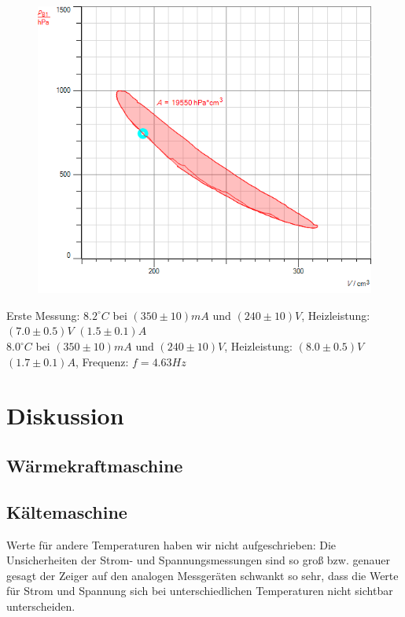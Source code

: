 \documentclass[12pt,a4paper,twopage]{article}
\begin{document}
\begin{center}
\begin{figure}[H]
\includegraphics[scale=0.7]{bachgraf/kaeltemaschine.png}
\label{kaeltemaschine-pv}
\end{figure}
\end{center}

Erste Messung:
$8.2^\circ C$ bei $(350 \pm 10)mA$ und $(240 \pm 10)V$, Heizleistung: $(7.0 \pm 0.5)V$ $(1.5 \pm 0.1)A$\\


$8.0^\circ C$ bei $(350 \pm 10)mA$ und $(240 \pm 10)V$, Heizleistung: $(8.0 \pm 0.5)V$ $(1.7 \pm 0.1)A$, Frequenz: $f=4.63Hz$\\


\section{Diskussion}
\subsection{Wärmekraftmaschine}
\subsection{Kältemaschine}
Werte für andere Temperaturen haben wir nicht aufgeschrieben: Die Unsicherheiten der Strom- und Spannungsmessungen sind so groß bzw. genauer gesagt der Zeiger auf den analogen Messgeräten schwankt so sehr, dass die Werte für Strom und Spannung sich bei unterschiedlichen Temperaturen nicht sichtbar unterscheiden.
																						
\end{document}
